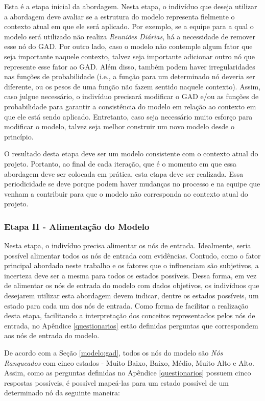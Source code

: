 Esta é a etapa inicial da abordagem. Nesta etapa, o indivíduo que deseja utilizar a abordagem deve avaliar se a estrutura do modelo representa fielmente o contexto atual em que ele será aplicado. Por exemplo, se a equipe para a qual o modelo será utilizado não realiza \textit{Reuniões Diárias}, há a necessidade de remover esse nó do GAD. Por outro lado, caso o modelo não contemple algum fator que seja importante naquele contexto, talvez seja importante adicionar outro nó que represente esse fator ao GAD. Além disso, também podem haver irregularidades nas funções de probabilidade (i.e., a função para um determinado nó deveria ser diferente, ou os pesos de uma função não fazem sentido naquele contexto). Assim, caso julgue necessário, o indivíduo precisará modificar o GAD e/ou as funções de probabilidade para garantir a consistência do modelo em relação ao contexto em que ele está sendo aplicado. Entretanto, caso seja necessário muito esforço para modificar o modelo, talvez seja melhor construir um novo modelo desde o princípio.

O resultado desta etapa deve ser um modelo consistente com o contexto atual do projeto. Portanto, ao final de cada iteração, que é o momento em que essa abordagem deve ser colocada em prática, esta etapa deve ser realizada. Essa periodicidade se deve porque podem haver mudanças no processo e na equipe que venham a contribuir para que o modelo não corresponda ao contexto atual do projeto.

\subsubsection{Etapa II - Alimentação do Modelo}
\label{descricao:alimentacao}

Nesta etapa, o indivíduo precisa alimentar os nós de entrada. Idealmente, seria possível alimentar todos os nós de entrada com evidências. Contudo, como o fator principal abordado neste trabalho e os fatores que o influenciam são subjetivos, a incerteza deve ser a mesma para todos os estados possíveis. Dessa forma, em vez de alimentar os nós de entrada do modelo com dados objetivos, os indivíduos que desejarem utilizar esta abordagem devem indicar, dentre os estados possíveis, um estado para cada um dos nós de entrada. Como forma de facilitar a realização desta etapa, facilitando a interpretação dos conceitos representados pelos nós de entrada, no Apêndice \ref{questionarios} estão definidas perguntas que correspondem aos nós de entrada do modelo.

De acordo com a Seção \ref{modelo:gad}, todos os nós do modelo são \textit{Nós Ranqueados} com cinco estados - Muito Baixo, Baixo, Médio, Muito Alto e Alto. Assim, como as perguntas definidas no Apêndice \ref{questionarios} possuem cinco respostas possíveis, é possível mapeá-las para um estado possível de um determinado nó da seguinte maneira:

